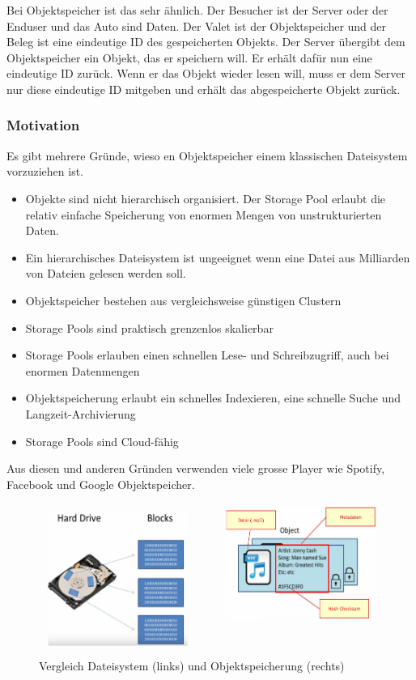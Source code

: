 \documentclass[a4paper, 11pt, nofootinbib]{article}
\begin{document}
Bei Objektspeicher ist das sehr ähnlich. Der Besucher ist der Server oder der Enduser und das Auto sind Daten. Der Valet ist der Objektspeicher und der Beleg ist eine eindeutige ID des gespeicherten Objekts. Der Server übergibt dem Objektspeicher ein Objekt, das er speichern will. Er erhält dafür nun eine eindeutige ID zurück. Wenn er das Objekt wieder lesen will, muss er dem Server nur diese eindeutige ID mitgeben und erhält das abgespeicherte Objekt zurück.

\subsubsection{Motivation}
Es gibt mehrere Gründe, wieso en Objektspeicher einem klassischen Dateisystem vorzuziehen ist.

\begin{itemize}
	\item Objekte sind nicht hierarchisch organisiert. Der Storage Pool erlaubt die relativ einfache Speicherung von enormen Mengen von unstrukturierten Daten.
	\item Ein hierarchisches Dateisystem ist ungeeignet wenn eine Datei aus Milliarden von Dateien gelesen werden soll.
	\item Objektspeicher bestehen aus vergleichsweise günstigen Clustern
	\item Storage Pools sind praktisch grenzenlos skalierbar 
	\item Storage Pools erlauben einen schnellen Lese- und Schreibzugriff, auch bei enormen Datenmengen
	\item Objektspeicherung erlaubt ein schnelles Indexieren, eine schnelle Suche und Langzeit-Archivierung
	\item Storage Pools sind Cloud-fähig
\end{itemize}

Aus diesen und anderen Gründen verwenden viele grosse Player wie Spotify, Facebook und Google Objektspeicher.

\begin{figure}[htb]
	\centering
	\includegraphics[keepaspectratio=true,height=10\baselineskip]{objekt_speicher.png}
	\caption{Vergleich Dateisystem (links) und Objektspeicherung (rechts)}
	\label{fig:objStor}
\end{figure}
\end{document}
